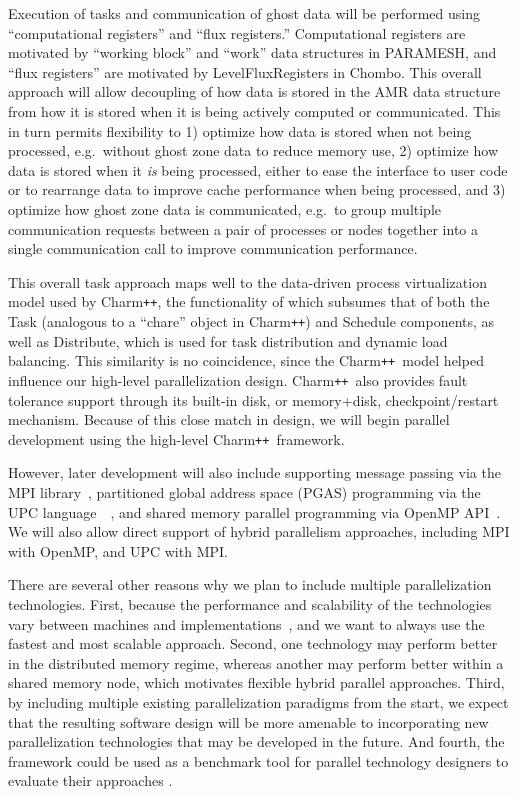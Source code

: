 \documentclass[11pt,letterpaper]{article}
\newcommand{\pp}{\texttt{++}}
\newcommand{\charm}{\textsf{Charm\pp}}
\newcommand{\chombo}{\textsf{Chombo}}
\newcommand{\paramesh}{\textsf{PARAMESH}}
\newcommand{\code}[1]{\textsf{#1}}
\begin{document}
Execution of tasks and communication of ghost data will be performed
using ``computational registers'' and ``flux registers.''
Computational registers are motivated by ``working block'' and
``work'' data structures in \paramesh, and ``flux registers'' are
motivated by \code{LevelFluxRegister}s in \chombo.  This overall
approach will allow decoupling of how data is stored in the AMR data
structure from how it is stored when it is being actively computed or
communicated.  This in turn permits flexibility to 1) optimize how
data is stored when not being processed, e.g.~without ghost zone data
to reduce memory use, 2) optimize how data is stored when it
\textit{is} being processed, either to ease the interface to user code
or to rearrange data to improve cache performance when being
processed, and 3) optimize how ghost zone data is communicated,
e.g.~to group multiple communication requests between a pair of
processes or nodes together into a single communication call to
improve communication performance.

This overall task approach maps well to the data-driven process
virtualization model used by \charm, the functionality of which
subsumes that of both the \code{Task} (analogous to a ``chare'' object
in \charm) and \code{Schedule} components, as well as
\code{Distribute}, which is used for task distribution and dynamic
load balancing.  This similarity is no coincidence, since the \charm\
model helped influence our high-level parallelization design.  \charm\
also provides fault tolerance support through its built-in disk, or
memory+disk, checkpoint/restart mechanism.  Because of this close
match in design, we will begin parallel development using the
high-level \charm\ framework.

However, later development will also include supporting message
passing via the MPI library~\cite{wwwmpi}, partitioned global address
space (PGAS) programming via the UPC
language~\cite{wwwupc}~\cite{upc}, and shared memory parallel
programming via OpenMP API~\cite{wwwopenmp}.  We will also allow
direct support of hybrid parallelism approaches, including MPI with
OpenMP, and UPC with MPI. 

There are several other reasons why we plan to include multiple
parallelization technologies.  First, because the performance and
scalability of the technologies vary between machines and
implementations~\cite{MaTa09}, and we want to always use the fastest
and most scalable approach.  Second, one technology may perform better
in the distributed memory regime, whereas another may perform better
within a shared memory node, which motivates flexible hybrid parallel
approaches.  Third, by including multiple existing parallelization
paradigms from the start, we expect that the resulting software design
will be more amenable to incorporating new parallelization
technologies that may be developed in the future.  And fourth, the
framework could be used as a benchmark tool for parallel technology
designers to evaluate their approaches \cite{WeSu07}.
\end{document}

